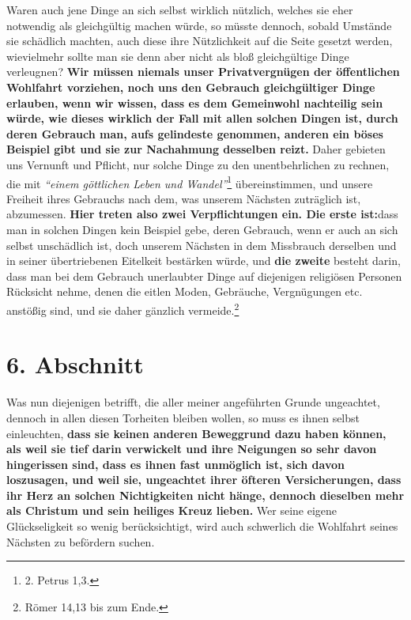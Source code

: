 Waren auch jene Dinge an sich selbst wirklich nützlich, welches sie eher
notwendig als gleichgültig machen würde, so müsste dennoch, sobald Umstände sie
schädlich machten, auch diese ihre Nützlichkeit auf die Seite gesetzt werden,
wievielmehr sollte man sie denn aber nicht als bloß gleichgültige Dinge
verleugnen? \textbf{Wir müssen niemals unser Privatvergnügen der öffentlichen
Wohlfahrt
vorziehen, noch uns den Gebrauch gleichgültiger Dinge erlauben, wenn wir wissen,
dass es dem Gemeinwohl nachteilig sein würde, wie dieses wirklich der Fall mit
allen solchen Dingen ist, durch deren Gebrauch man, aufs gelindeste genommen,
anderen ein böses Beispiel gibt und sie zur Nachahmung desselben reizt.} Daher
gebieten uns Vernunft und Pflicht, nur solche Dinge zu den unentbehrlichen zu
rechnen, die mit
\textit{"`einem göttlichen Leben und Wandel"'}\footnote{2. Petrus 1,3.}
übereinstimmen, und unsere Freiheit ihres Gebrauchs nach dem, was unserem
Nächsten zuträglich ist, abzumessen. \textbf{Hier treten also zwei
Verpflichtungen ein.
Die erste ist:}dass man in solchen Dingen kein Beispiel gebe, deren Gebrauch,
wenn er auch an sich selbst unschädlich ist, doch unserem Nächsten in dem
Missbrauch derselben und in seiner übertriebenen Eitelkeit bestärken würde, und
\textbf{die zweite} besteht darin, dass man bei dem Gebrauch unerlaubter Dinge
auf
diejenigen religiösen Personen Rücksicht nehme, denen die eitlen Moden,
Gebräuche, Vergnügungen etc. anstößig sind, und sie daher gänzlich
vermeide.\footnote{Römer 14,13 bis zum Ende.}

\section{6. Abschnitt} \label{kap18_ab6}

Was nun diejenigen betrifft, die aller meiner angeführten Grunde ungeachtet,
dennoch in allen diesen Torheiten bleiben wollen, so muss es ihnen selbst
einleuchten, \textbf{dass sie keinen anderen Beweggrund dazu haben können, als
weil sie
tief darin verwickelt und ihre Neigungen so sehr davon hingerissen sind, dass es
ihnen fast unmöglich ist, sich davon loszusagen, und weil sie, ungeachtet ihrer
öfteren Versicherungen, dass ihr Herz an solchen Nichtigkeiten nicht hänge,
dennoch dieselben mehr als Christum und sein heiliges Kreuz
lieben.} Wer seine
eigene Glückseligkeit so wenig berücksichtigt, wird auch schwerlich die
Wohlfahrt seines Nächsten zu befördern suchen.

